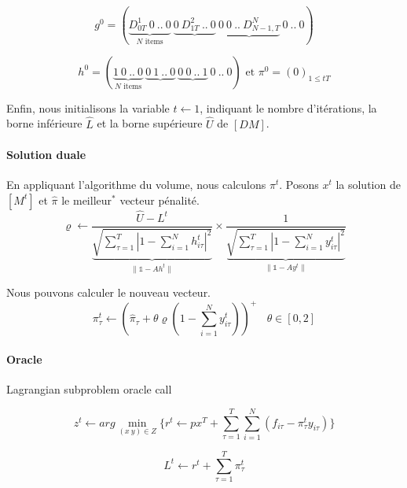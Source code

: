 \documentclass[12pt,a4paper]{article}
\begin{document}
 $$ g^0=(\underbrace{D^1_{0T}~0~..~0}_{N \text{ items}} ~ \underbrace{0~D^2_{1T}~..~0} ~ \underbrace{0~0~..~D^N_{N-1,T}} ~0~..~0) $$ 
 
 $$h^0=(\underbrace{1~0~..~0}_{N \text{ items}} ~ \underbrace{0~1~..~0} ~ \underbrace{0~0~..~1} ~0~..~0) \text{ et } \pi^0=(0)_{1 \leq t T} $$
 
 Enfin, nous initialisons la variable $t \leftarrow 1$, indiquant le nombre d'itérations, la borne inférieure $\hat{L}$ et la borne supérieure $\hat{U}$ de $[DM]$.
 
 \paragraph{Solution duale} En appliquant l'algorithme du volume, nous calculons $\pi^{t}$. Posons $x^t$ la solution de $[M^t]$ et $\hat{\pi}$ le meilleur$^*$ vecteur pénalité.
 $$\varrho \leftarrow  \dfrac{\hat{U}-L^t}{\underbrace{\sqrt{\sum_{\tau=1}^T  
 |1 - \sum_{i=1}^N h_{i \tau}^t|^2 }}_{\parallel \mathds{1} - Ah^t \parallel}} \times \dfrac{1}{\underbrace{\sqrt{\sum_{\tau=1}^T |1 - \sum_{i=1}^N y_{i \tau}^t|^2 }}_{\parallel \mathds{1} - Ay^t \parallel}}$$
 
 Nous pouvons calculer le nouveau vecteur.
 $$ \pi^t_\tau \leftarrow (\hat{\pi}_\tau + \theta \varrho (1-\sum_{i=1}^Ny^t_{i\tau}))^+ ~~~~ \theta \in [0,2] $$
 
 \paragraph{Oracle} Lagrangian subproblem oracle call
 
 $$ z^t \leftarrow arg\min_{(x~y)\in Z}\{ r^t \leftarrow px^T +  \sum_{\tau=1}^T \sum_{i=1}^N ( f_{i\tau} - \pi_{\tau}^t y_{i\tau}) \}$$
 
 $$L^t \leftarrow r^t + \sum_{\tau=1}^T \pi_{\tau}^t$$
 
 
 
\end{document}

